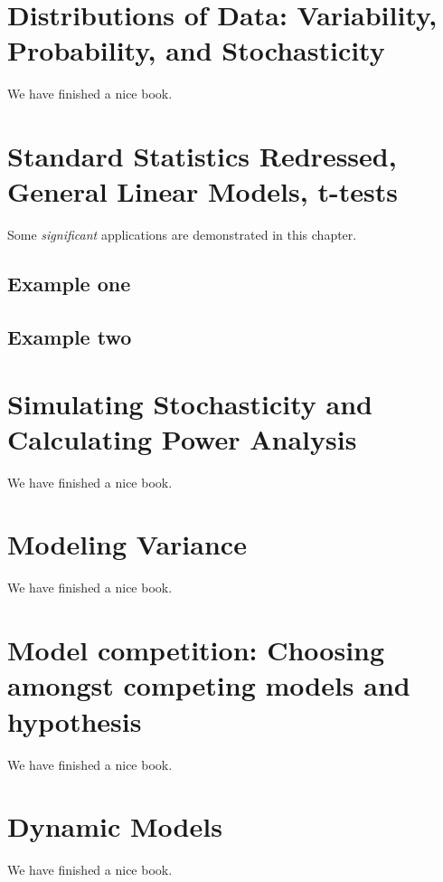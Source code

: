 \documentclass[
]{book}
\begin{document}
\chapter{Distributions of Data: Variability, Probability, and Stochasticity}\label{distributions-of-data-variability-probability-and-stochasticity}

We have finished a nice book.

\chapter{Standard Statistics Redressed, General Linear Models, t-tests}\label{standard-statistics-redressed-general-linear-models-t-tests}

Some \emph{significant} applications are demonstrated in this chapter.

\section{Example one}\label{example-one}

\section{Example two}\label{example-two}

\chapter{Simulating Stochasticity and Calculating Power Analysis}\label{simulating-stochasticity-and-calculating-power-analysis}

We have finished a nice book.

\chapter{Modeling Variance}\label{modeling-variance}

We have finished a nice book.

\chapter{Model competition: Choosing amongst competing models and hypothesis}\label{model-competition-choosing-amongst-competing-models-and-hypothesis}

We have finished a nice book.

\chapter{Dynamic Models}\label{dynamic-models}

We have finished a nice book.

  
\end{document}
